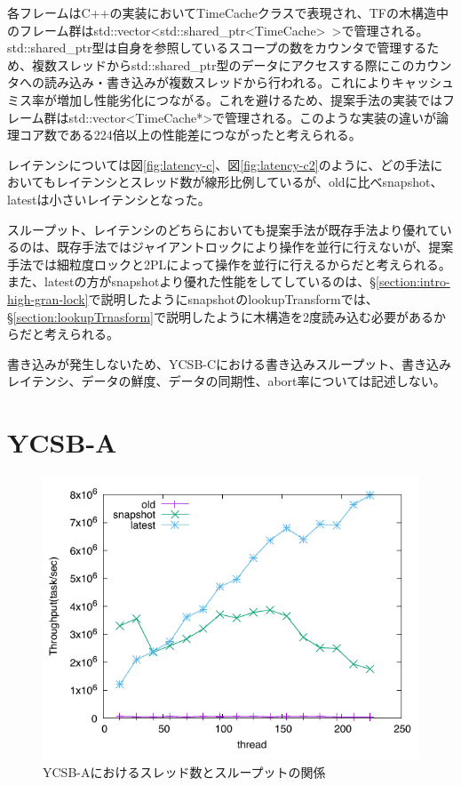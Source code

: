 \documentclass[a4paper]{jreport}	%
\begin{document}
各フレームはC++の実装においてTimeCacheクラスで表現され、TFの木構造中のフレーム群はstd::vector<std::shared\_ptr<TimeCache>~>で管理される。std::shared\_ptr型は自身を参照しているスコープの数をカウンタで管理するため、複数スレッドからstd::shared\_ptr型のデータにアクセスする際にこのカウンタへの読み込み・書き込みが複数スレッドから行われる。これによりキャッシュミス率が増加し性能劣化につながる。これを避けるため、提案手法の実装ではフレーム群はstd::vector<TimeCache*>で管理される。このような実装の違いが論理コア数である224倍以上の性能差につながったと考えられる。

レイテンシについては図\ref{fig:latency-c}、図\ref{fig:latency-c2}のように、どの手法においてもレイテンシとスレッド数が線形比例しているが、oldに比べsnapshot、latestは小さいレイテンシとなった。

スループット、レイテンシのどちらにおいても提案手法が既存手法より優れているのは、既存手法ではジャイアントロックにより操作を並行に行えないが、提案手法では細粒度ロックと2PLによって操作を並行に行えるからだと考えられる。また、latestの方がsnapshotより優れた性能をしてしているのは、§\ref{section:intro-high-gran-lock}で説明したようにsnapshotのlookupTransformでは、§\ref{section:lookupTrnasform}で説明したように木構造を2度読み込む必要があるからだと考えられる。

書き込みが発生しないため、YCSB-Cにおける書き込みスループット、書き込みレイテンシ、データの鮮度、データの同期性、abort率については記述しない。

\section{YCSB-A}
\label{section:ycsb-a}

\begin{figure}[h] 
\centering
\includegraphics[width=15cm]{ycsb-a/opposite-throughput}
\caption{YCSB-Aにおけるスレッド数とスループットの関係}
\label{fig:a-throughput}
\end{figure}
\end{document}
